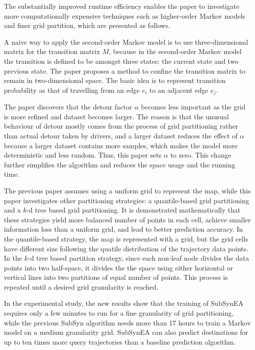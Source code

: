 \documentclass[paper=a4, fontsize=18pt]{article} %
\numberwithin{equation}{section} %
\numberwithin{figure}{section} %
\numberwithin{table}{section} %
\begin{document}
The substantially improved runtime efficiency enables the paper to investigate more computationally expensive techniques such as higher-order Markov models and finer grid partition, which are presented as follows.

A naive way to apply the second-order Markov model is to use three-dimensional matrix for the transition matrix $M$, because in the second-order Markov model the transition is defined to be amongst three states: the current state and two previous state. The paper proposes a method to confine the transition matrix to remain in two-dimensional space. The basic idea is to represent transition probability as that of travelling from an edge $e_i$ to an adjacent edge $e_j$.

The paper discovers that the detour factor $\alpha$ becomes less important as the grid is more refined and dataset becomes larger. The reason is that the unusual behaviour of detour mostly comes from the process of grid partitioning rather than actual detour taken by drivers, and a larger dataset reduces the effect of $\alpha$ because a larger dataset contains more samples, which makes the model more deterministic and less random. Thus, this paper sets $\alpha$ to zero. This change further simplifies the algorithm and reduces the space usage and the running time.

The previous paper assumes using a uniform grid to represent the map, while this paper investigates other partitioning strategies: a quantile-based grid partitioning and a $k$-d tree based grid partitioning. It is demonstrated mathematically that these strategies yield more balanced number of points in each cell, achieve smaller information loss than a uniform grid, and lead to better prediction accuracy. In the quantile-based strategy, the map is represented with a grid, but the grid cells have different size following the quatile distribution of the trajectory data points. In the $k$-d tree based partition strategy, since each non-leaf node divides the data points into two half-space, it divides the the space using either horizontal or vertical lines into two partitions of equal number of points. This process is repeated until a desired grid granularity is reached.

In the experimental study, the new results show that the training of SubSynEA requires only a few minutes to run for a fine granularity of grid partitioning, while the previous SubSyn algorithm needs more than 17 hours to train a Markov model on a medium granularity grid. SubSynEA can also predict destinations for up to ten times more query trajectories than a baseline prediction algorithm.
\end{document}
